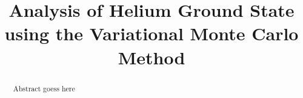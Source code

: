 \documentclass[conference]{IEEEtran}
\begin{document}
\title{Analysis of Helium Ground State using the Variational Monte Carlo Method}


\author{
\and
{}
\and
{}
}


\maketitle


\begin{abstract}

Abstract goess here

\end{abstract}

\IEEEpeerreviewmaketitle














\end{document}
